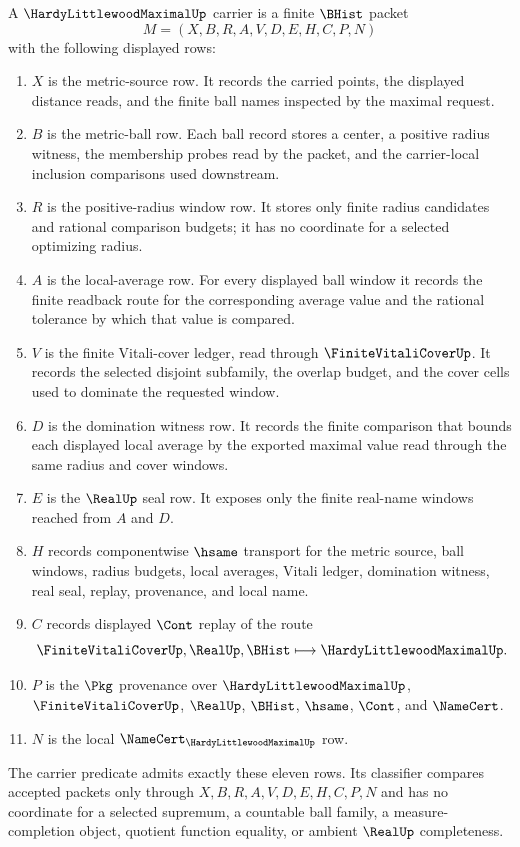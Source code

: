 \begin{definition}
\label{def:hardy-littlewood-maximal-carrier}
A $\HardyLittlewoodMaximalUp$ carrier is a finite $\BHist$ packet
$$
M=(X,B,R,A,V,D,E,H,C,P,N)
$$
with the following displayed rows:
\begin{enumerate}
\item $X$ is the metric-source row. It records the carried points, the displayed distance reads, and the finite ball names inspected by the maximal request.
\item $B$ is the metric-ball row. Each ball record stores a center, a positive radius witness, the membership probes read by the packet, and the carrier-local inclusion comparisons used downstream.
\item $R$ is the positive-radius window row. It stores only finite radius candidates and rational comparison budgets; it has no coordinate for a selected optimizing radius.
\item $A$ is the local-average row. For every displayed ball window it records the finite readback route for the corresponding average value and the rational tolerance by which that value is compared.
\item $V$ is the finite Vitali-cover ledger, read through $\FiniteVitaliCoverUp$. It records the selected disjoint subfamily, the overlap budget, and the cover cells used to dominate the requested window.
\item $D$ is the domination witness row. It records the finite comparison that bounds each displayed local average by the exported maximal value read through the same radius and cover windows.
\item $E$ is the $\RealUp$ seal row. It exposes only the finite real-name windows reached from $A$ and $D$.
\item $H$ records componentwise $\hsame$ transport for the metric source, ball windows, radius budgets, local averages, Vitali ledger, domination witness, real seal, replay, provenance, and local name.
\item $C$ records displayed $\Cont$ replay of the route
$$
\FiniteVitaliCoverUp,\RealUp,\BHist
\longmapsto
\HardyLittlewoodMaximalUp .
$$
\item $P$ is the $\Pkg$ provenance over $\HardyLittlewoodMaximalUp$, $\FiniteVitaliCoverUp$, $\RealUp$, $\BHist$, $\hsame$, $\Cont$, and $\NameCert$.
\item $N$ is the local $\NameCert_{\HardyLittlewoodMaximalUp}$ row.
\end{enumerate}
The carrier predicate admits exactly these eleven rows. Its classifier compares accepted packets only through $X,B,R,A,V,D,E,H,C,P,N$ and has no coordinate for a selected supremum, a countable ball family, a measure-completion object, quotient function equality, or ambient $\RealUp$ completeness.
\end{definition}

